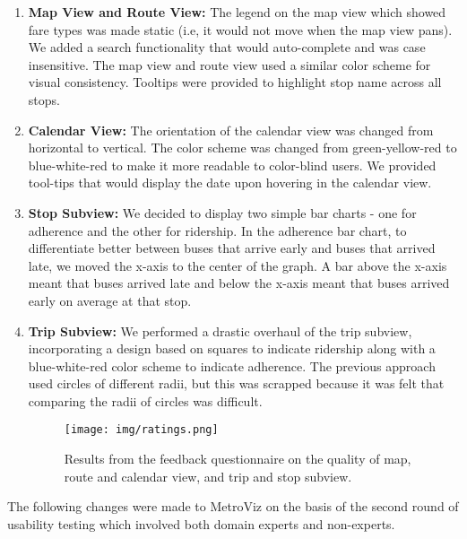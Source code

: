 \documentclass[journal]{vgtc}
\begin{document}
\begin{enumerate}

\item \textbf{Map View and Route View:} The legend on the map view which showed fare types was made static (i.e, it would not move when the map view pans). We added a search functionality that would auto-complete and was case insensitive. The map view and route view used a similar color scheme for visual consistency. Tooltips were provided to highlight stop name across all stops. 

\item \textbf{Calendar View:} The orientation of the calendar view was changed from horizontal to vertical. The color scheme was changed from green-yellow-red to blue-white-red to make it more readable to color-blind users. We provided tool-tips that would display the date upon hovering in the calendar view.

\item \textbf{Stop Subview:} We decided to display two simple bar charts - one for adherence and the other for ridership. In the adherence bar chart, to differentiate better between buses that arrive early and buses that arrived late, we moved the x-axis to the center of the graph. A bar above the x-axis meant that buses arrived late and below the x-axis meant that buses arrived early on average at that stop. 
 
\item \textbf{Trip Subview:} We performed a drastic overhaul of the trip subview, incorporating a design based on squares to indicate ridership along with a blue-white-red color scheme to indicate adherence. The previous approach used circles of different radii, but this was scrapped because it was felt that comparing the radii of circles was difficult.

\begin{figure}[htb]

 \centering

 \texttt{[image: img/ratings.png]}

 \caption{Results from the feedback questionnaire on the quality of map, route and calendar view, and trip and stop subview.}

 \label{ratings}

\end{figure}

\end{enumerate}

\noindent

The following changes were made to MetroViz on the basis of the second round of usability testing which involved both domain experts and non-experts. 
\end{document}
